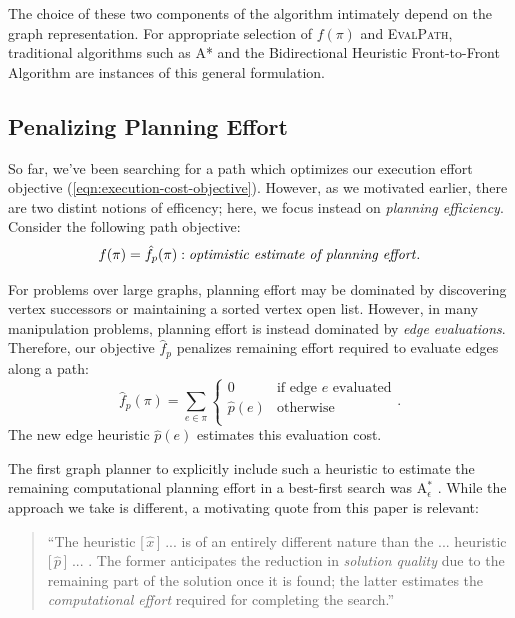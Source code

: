 \vspace{0.1in}
The choice of these two components of the algorithm
intimately depend on the graph representation.
For appropriate selection
of $f(\pi)$ and \textsc{EvalPath},
traditional algorithms such as A* \citep{hart1968astar}
and the Bidirectional Heuristic Front-to-Front Algorithm
\citep{sint1977bhffa}
are instances of this general formulation.

\subsection{Penalizing Planning Effort}

So far, we've been searching for a path which optimizes our execution
effort objective (\ref{eqn:execution-cost-objective}).
However, as we motivated earlier,
there are two distint notions of efficency;
here, we focus instead on \emph{planning efficiency}.
Consider the following path objective:
\begin{equation}
   f(\pi) = \hat{f}_p(\pi) : \mbox{\emph{optimistic estimate of planning effort}}.
\end{equation}

For problems over large graphs,
planning effort may be dominated by discovering vertex successors
or maintaining a sorted vertex open list.
However, in many manipulation problems,
planning effort is instead dominated by \emph{edge evaluations}.
Therefore, our objective $\hat{f}_p$
penalizes remaining effort required to evaluate edges
along a path:
\begin{equation}
   \hat{f}_p(\pi) = \sum_{e \in \pi} \left\{
   \begin{array}{cl}
      0 & \mbox{if edge } e \mbox{ evaluated}  \\
      \hat{p}(e) & \mbox{otherwise} \\
   \end{array}
   \right.
   .
\end{equation}
The new edge heuristic $\hat{p}(e)$ estimates this evaluation cost.

The first graph planner to explicitly include such a heuristic
to estimate the remaining
computational planning effort in a best-first search
was A$_\epsilon^*$ \citep{pearl1982semiadmissible}.
While the approach we take is different,
a motivating quote from this paper is relevant:
\begin{quote}
``The heuristic [\,$\hat{x}$\,] ... is of an entirely
different nature than the ... heuristic [\,$\hat{p}$\,] ... .
The former anticipates the reduction in \emph{solution quality} due to the
remaining part of the solution once it is found;
the latter estimates the \emph{computational effort}
required for completing the search.''
\end{quote}

